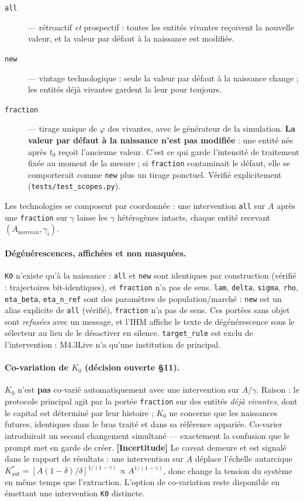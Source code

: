 \documentclass[11pt,a4paper]{article}
\newcommand{\code}[1]{\texttt{#1}}
\newcommand{\incertitude}{\textbf{[Incertitude]}}
\begin{document}
\begin{description}
\item[\code{all}] --- rétroactif \emph{et} prospectif : toutes les entités
  vivantes reçoivent la nouvelle valeur, et la valeur par défaut à la
  naissance est modifiée.
\item[\code{new}] --- vintage technologique : seule la valeur par défaut à
  la naissance change ; les entités déjà vivantes gardent la leur pour
  toujours.
\item[\code{fraction}] --- tirage unique de $\varphi$ des vivantes, avec le
  générateur de la simulation. \textbf{La valeur par défaut à la naissance
  n'est pas modifiée} : une entité née après $t_0$ reçoit l'ancienne
  valeur. C'est ce qui garde l'intensité de traitement fixée au moment de
  la mesure ; si \code{fraction} contaminait le défaut, elle se comporterait
  comme \code{new} plus un tirage ponctuel. Vérifié explicitement
  (\code{tests/test\_scopes.py}).
\end{description}

Les technologies se composent par coordonnée : une intervention \code{all}
sur $A$ après une \code{fraction} sur $\gamma$ laisse les $\gamma$
hétérogènes intacts, chaque entité recevant $(A_{\text{nouveau}},
\gamma_i)$.

\paragraph{Dégénérescences, affichées et non masquées.} \code{K0} n'existe
qu'à la naissance : \code{all} et \code{new} sont identiques par
construction (vérifié : trajectoires bit-identiques), et \code{fraction}
n'a pas de sens. \code{lam}, \code{delta}, \code{sigma}, \code{rho},
\code{eta\_beta}, \code{eta\_n\_ref} sont des paramètres de
population/marché : \code{new} est un alias explicite de \code{all}
(vérifié), \code{fraction} n'a pas de sens. Ces portées sans objet sont
\emph{refusées} avec un message, et l'IHM affiche le texte de dégénérescence
sous le sélecteur au lieu de le désactiver en silence. \code{target\_rule}
est exclu de l'intervention : M4.3Live n'a qu'une institution de principal.

\paragraph{Co-variation de $K_0$ (décision ouverte §11).} $K_0$ n'est
\textbf{pas} co-varié automatiquement avec une intervention sur
$A$/$\gamma$. Raison : le protocole principal agit par la portée
\code{fraction} sur des entités \emph{déjà vivantes}, dont le capital est
déterminé par leur histoire ; $K_0$ ne concerne que les naissances futures,
identiques dans le bras traité et dans sa référence appariée. Co-varier
introduirait un second changement simultané --- exactement la confusion que
le prompt met en garde de créer. \incertitude{} Le caveat demeure et est
signalé dans le rapport de résultats : une intervention sur $A$ déplace
l'échelle autarcique $K^{*}_{\mathrm{aut}}=[A(1-\delta)/\delta]^{1/(1-\gamma)}
\propto A^{1/(1-\gamma)}$, donc change la tension du système en même temps
que l'extraction. L'option de co-variation reste disponible en émettant une
intervention \code{K0} distincte.
\end{document}
